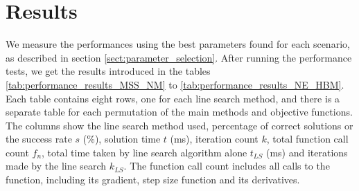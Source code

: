 \documentclass[english, 12pt, a4paper, sci, utf8, a-1b, online, table]{aaltothesis}
\begin{document}


\section{Results}
\label{sect:results}

We measure the performances using the best parameters found for each scenario, as described in section \ref{sect:parameter_selection}. After running the performance tests, we get the results introduced in the tables \ref{tab:performance_results_MSS_NM} to \ref{tab:performance_results_NE_HBM}. Each table contains eight rows, one for each line search method, and there is a separate table for each permutation of the main methods and objective functions. The columns show the line search method used, percentage of correct solutions or the success rate $s$ (\%), solution time $t$ (ms), iteration count $k$, total function call count $f_n$, total time taken by line search algorithm alone $t_{LS}$ (ms) and iterations made by the line search $k_{LS}$. The function call count includes all calls to the function, including its gradient, step size function and its derivatives.
\end{document}
